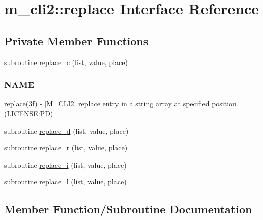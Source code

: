 \hypertarget{interfacem__cli2_1_1replace}{}\section{m\+\_\+cli2\+:\+:replace Interface Reference}
\label{interfacem__cli2_1_1replace}
\subsection*{Private Member Functions}
\begin{DoxyCompactItemize}
\item 
subroutine \mbox{\hyperlink{interfacem__cli2_1_1replace_ab4d59b6a69d2768bf724f53604b3d0a9}{replace\+\_\+c}} (list, value, place)
\begin{DoxyCompactList}\small\item\em \subsubsection*{N\+A\+ME}

replace(3f) -\/ \mbox{[}M\+\_\+\+C\+L\+I2\mbox{]} replace entry in a string array at specified position (L\+I\+C\+E\+N\+SE\+:PD) \end{DoxyCompactList}\item 
subroutine \mbox{\hyperlink{interfacem__cli2_1_1replace_a606ded35a3f0d06cb61a28db82ab5ae7}{replace\+\_\+d}} (list, value, place)
\item 
subroutine \mbox{\hyperlink{interfacem__cli2_1_1replace_adf284ee215097b8416e81532b7d4251b}{replace\+\_\+r}} (list, value, place)
\item 
subroutine \mbox{\hyperlink{interfacem__cli2_1_1replace_a73a0dab38328c3db8a7eef48e27390bd}{replace\+\_\+i}} (list, value, place)
\item 
subroutine \mbox{\hyperlink{interfacem__cli2_1_1replace_a9c995edced1d2665777e794a3aa5b2a0}{replace\+\_\+l}} (list, value, place)
\end{DoxyCompactItemize}


\subsection{Member Function/\+Subroutine Documentation}
\mbox{\label{interfacem__cli2_1_1replace_ab4d59b6a69d2768bf724f53604b3d0a9}} 
